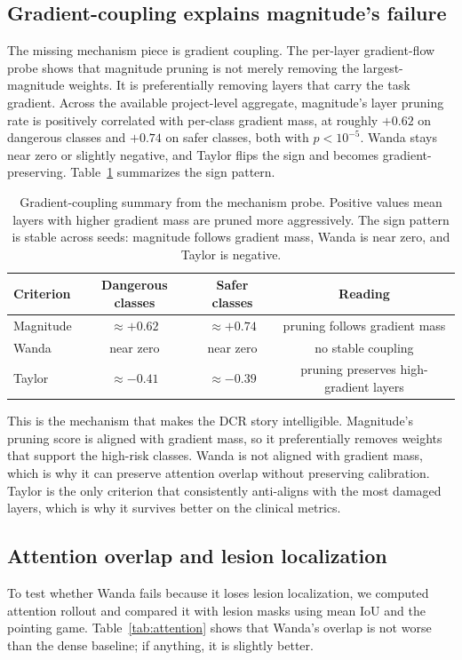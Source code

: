 \documentclass{article}
\begin{document}
\subsection{Gradient-coupling explains magnitude's failure}
The missing mechanism piece is gradient coupling. The per-layer gradient-flow probe shows that magnitude pruning is not merely removing the largest-magnitude weights. It is preferentially removing layers that carry the task gradient. Across the available project-level aggregate, magnitude's layer pruning rate is positively correlated with per-class gradient mass, at roughly $+0.62$ on dangerous classes and $+0.74$ on safer classes, both with $p < 10^{-5}$. Wanda stays near zero or slightly negative, and Taylor flips the sign and becomes gradient-preserving. Table~\ref{tab:grad_coupling} summarizes the sign pattern.

\begin{table}[t]
\centering
\small
\caption{Gradient-coupling summary from the mechanism probe. Positive values mean layers with higher gradient mass are pruned more aggressively. The sign pattern is stable across seeds: magnitude follows gradient mass, Wanda is near zero, and Taylor is negative.}
\label{tab:grad_coupling}
\begin{tabular}{lccc}
\toprule
Criterion & Dangerous classes & Safer classes & Reading \\
\midrule
Magnitude & $\approx +0.62$ & $\approx +0.74$ & pruning follows gradient mass \\
Wanda & near zero & near zero & no stable coupling \\
Taylor & $\approx -0.41$ & $\approx -0.39$ & pruning preserves high-gradient layers \\
\bottomrule
\end{tabular}
\end{table}

This is the mechanism that makes the DCR story intelligible. Magnitude's pruning score is aligned with gradient mass, so it preferentially removes weights that support the high-risk classes. Wanda is not aligned with gradient mass, which is why it can preserve attention overlap without preserving calibration. Taylor is the only criterion that consistently anti-aligns with the most damaged layers, which is why it survives better on the clinical metrics.

\subsection{Attention overlap and lesion localization}
To test whether Wanda fails because it loses lesion localization, we computed attention rollout and compared it with lesion masks using mean IoU and the pointing game. Table~\ref{tab:attention} shows that Wanda's overlap is not worse than the dense baseline; if anything, it is slightly better.
\end{document}
